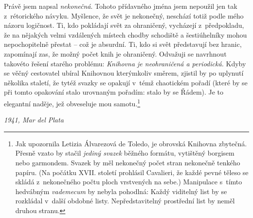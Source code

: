 \documentclass[11pt]{article}
\begin{document}
Právě jsem napsal \textit{nekonečná}. Tohoto přídavného jména jsem nepoužil jen tak z~rétorického návyku. Myšlence, že svět je nekonečný, neschází totiž podle mého názoru logičnost. Ti, kdo pokládají svět za ohraničený, vycházejí z~předpokladu, že na nějakých velmi vzdálených místech chodby schodiště a šestiúhelníky mohou nepochopitelně přestat -- což je absurdní. Ti, kdo si svět představují bez hranic, zapomínají zas, že možný počet knih je ohraničený. Odvažuji se navrhnout takovéto řešení starého problému: \textit{Knihovna je neohraničená a periodická.} Kdyby se věčný cestovatel ubíral Knihovnou kterýmkoliv směrem, zjistil by po uplynutí několika staletí, že tytéž svazky se opakují v~témž chaotickém pořadí (které by se při tomto opakování stalo urovnaným pořadím: stalo by se Řádem). Je to elegantní naděje, jež obveseluje mou samotu.\footnote{Jak upozornila Letizia Álvarezová de Toledo, je obrovská Knihovna zbytečná. Přesně vzato by stačil \textit{jediný svazek} běžného formátu, vytištěný borgisem nebo garmondem. Svazek by měl nekonečný počet stran nekonečně tenkého papíru. (Na počátku XVII. století prohlásil Cavalieri, že každé pevné těleso se skládá z~nekonečného počtu ploch vrstvených na sebe.) Manipulace s~tímto hedvábným \textit{vademecum} by nebyla pohodlná: Každý viditelný list by se rozkládal v~další obdobné listy. Nepředstavitelný prostřední list by neměl druhou stranu.}

\raggedleft
\textit{1941, Mar del Plata}
\end{document}
